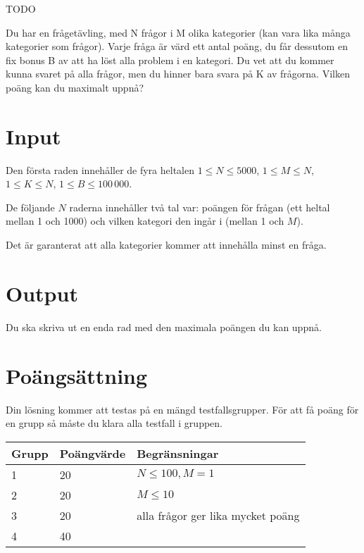 
TODO

Du har en frågetävling, med N frågor i M olika kategorier (kan vara lika många kategorier som frågor).
Varje fråga är värd ett antal poäng, du får dessutom en fix bonus B av att ha löst alla problem i en kategori.
Du vet att du kommer kunna svaret på alla frågor, men du hinner bara svara på K av frågorna. Vilken poäng kan du maximalt uppnå?

\section*{Input}
Den första raden innehåller de fyra heltalen $1 \le N \le 5000$, $1 \le M \le N$, $1 \le K \le N$, $1 \le B \le 100\,000$.

De följande $N$ raderna innehåller två tal var: poängen för frågan (ett heltal mellan 1 och 1000) och vilken kategori den ingår i (mellan 1 och $M$).

Det är garanterat att alla kategorier kommer att innehålla minst en fråga.

\section*{Output}
Du ska skriva ut en enda rad med den maximala poängen du kan uppnå.

\section*{Poängsättning}
Din lösning kommer att testas på en mängd testfallsgrupper. För att få poäng för en grupp så måste du klara alla testfall i gruppen.

\begin{tabular}{| l | l | l |}
	\hline
	Grupp & Poängvärde & Begränsningar\\ \hline
  1     & 20         & $N \le 100, M = 1$ \\ \hline
  2     & 20         & $M \le 10$ \\ \hline
  3     & 20         & alla frågor ger lika mycket poäng \\ \hline
  4     & 40         & \\ \hline
\end{tabular}
